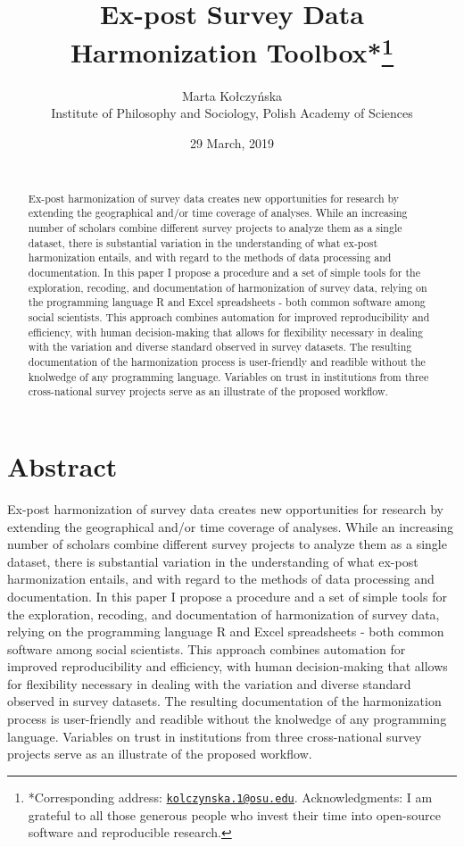 \documentclass[12pt,]{article}
\title{\vspace{1cm}Ex-post Survey Data Harmonization Toolbox*\footnote{*Corresponding address: \href{mailto:kolczynska.1@osu.edu}{\nolinkurl{kolczynska.1@osu.edu}}. Acknowledgments: I am grateful to all those generous people who invest their time into open-source software and reproducible research.}\vspace{0.5cm}\\}
\author{Marta Kołczyńska\\
Institute of Philosophy and Sociology, Polish Academy of Sciences}
\date{29 March, 2019\\
~\\}
\begin{document}
\maketitle
\begin{abstract}
\noindent{}Ex-post harmonization of survey data creates new opportunities for research by extending the geographical and/or time coverage of analyses. While an increasing number of scholars combine different survey projects to analyze them as a single dataset, there is substantial variation in the understanding of what ex-post harmonization entails, and with regard to the methods of data processing and documentation. In this paper I propose a procedure and a set of simple tools for the exploration, recoding, and documentation of harmonization of survey data, relying on the programming language R and Excel spreadsheets - both common software among social scientists. This approach combines automation for improved reproducibility and efficiency, with human decision-making that allows for flexibility necessary in dealing with the variation and diverse standard observed in survey datasets. The resulting documentation of the harmonization process is user-friendly and readible without the knolwedge of any programming language. Variables on trust in institutions from three cross-national survey projects serve as an illustrate of the proposed workflow.\vspace{.8cm}
\end{abstract}

\clearpage

\renewcommand{\baselinestretch}{0.5}\normalsize
\tableofcontents
\renewcommand{\baselinestretch}{1.5}\normalsize

\clearpage

\hypertarget{abstract}{%
\section{Abstract}\label{abstract}}

Ex-post harmonization of survey data creates new opportunities for research by extending the geographical and/or time coverage of analyses. While an increasing number of scholars combine different survey projects to analyze them as a single dataset, there is substantial variation in the understanding of what ex-post harmonization entails, and with regard to the methods of data processing and documentation. In this paper I propose a procedure and a set of simple tools for the exploration, recoding, and documentation of harmonization of survey data, relying on the programming language R and Excel spreadsheets - both common software among social scientists. This approach combines automation for improved reproducibility and efficiency, with human decision-making that allows for flexibility necessary in dealing with the variation and diverse standard observed in survey datasets. The resulting documentation of the harmonization process is user-friendly and readible without the knolwedge of any programming language. Variables on trust in institutions from three cross-national survey projects serve as an illustrate of the proposed workflow.
\end{document}
